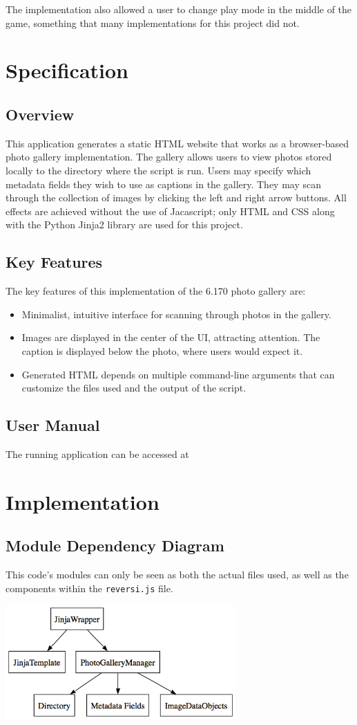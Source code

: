 \documentclass[11pt,letterpaper]{article}
\begin{document}
The implementation also allowed a user to change play mode in the middle of the game, something that many implementations for this project did not.
\section{Specification}
\subsection{Overview}
This application generates a static HTML website that works as a browser-based photo gallery implementation. The gallery allows users to view photos stored locally to the directory where the script is run. Users may specify which metadata fields they wish to use as captions in the gallery. They may scan through the collection of images by clicking the left and right arrow buttons. All effects are achieved without the use of Jacascript; only HTML and CSS along with the Python Jinja2 library are used for this project.
\subsection{Key Features}
The key features of this implementation of the 6.170 photo gallery are:
\begin{itemize}
\item Minimalist, intuitive interface for scanning through photos in the gallery.
\item Images are displayed in the center of the UI, attracting attention. The caption is displayed below the photo, where users would expect it.
\item Generated HTML depends on multiple command-line arguments that can customize the files used and the output of the script.
\end{itemize}
\subsection{User Manual}
The running application can be accessed at 


\section{Implementation}

\subsection{Module Dependency Diagram}
This code's modules can only be seen as both the actual files used, as well as the components within the \texttt{reversi.js} file.
\begin{center}
\includegraphics[width=250pt]{dot/moddepdiagram.png}
\label{fig:ob2} 
\end{center}
\end{document}
